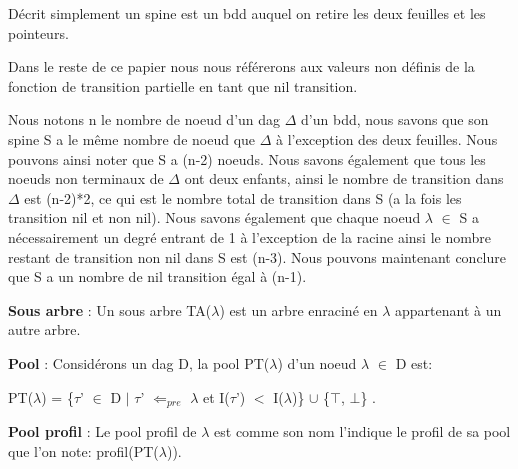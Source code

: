 \documentclass[french]{article}
\begin{document}
Décrit simplement un spine est un bdd auquel on retire les deux feuilles et les pointeurs.

Dans le reste de ce papier nous nous référerons aux valeurs non définis de la fonction de transition partielle en tant que nil transition.
\vspace{5mm} %

Nous notons n le nombre de noeud d'un dag \(\Delta\) d'un bdd, nous savons que son spine S a le même nombre de noeud que \(\Delta\) à l'exception des deux feuilles. Nous pouvons ainsi noter que S a (n-2) noeuds. Nous savons également que tous les noeuds non terminaux de \(\Delta\) ont deux enfants, ainsi le nombre de transition dans \(\Delta\) est (n-2)*2, ce qui est le nombre total de transition dans S (a la fois les transition nil et non nil). Nous savons également que chaque noeud \(\lambda\) \(\in\) S a nécessairement un degré entrant de 1 à l'exception de la racine ainsi le nombre restant de transition non nil dans S est (n-3). Nous pouvons maintenant conclure que S a un nombre de nil transition égal à (n-1).
\vspace{5mm} %

\textbf{Sous arbre} : Un sous arbre TA(\(\lambda\)) est un arbre enraciné en \(\lambda\) appartenant à un autre arbre.

\textbf{Pool} : Considérons un dag D, la pool PT(\(\lambda\)) d'un noeud \(\lambda\) \(\in\) D est:

\begin{center}
PT(\(\lambda\)) = \{\(\tau\)’ \(\in\) D \(\mid\)  \(\tau\)’ \(\Leftarrow_{pre}\) \(\lambda\) et I(\(\tau\)’) \(<\) I(\(\lambda\))\} \(\cup\) \{\(\top\), \(\bot\)\} .
\end{center}

\textbf{Pool profil} : Le pool profil de \(\lambda\) est comme son nom l'indique le profil de sa pool que l'on note: profil(PT(\(\lambda\))). 
\end{document}
